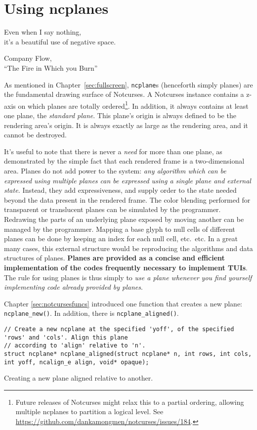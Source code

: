 \section{Using ncplanes}
\label{sec:planes}
\epigraph{Even when I say nothing,\\ it's a beautiful use of negative space.}{Company Flow,\\``The Fire in Which you Burn''}
\label{ncplane}
As mentioned in Chapter~\ref{sec:fullscreen}, \texttt{ncplane}s (henceforth
simply planes) are the fundamental drawing surface of Notcurses. A Notcurses
instance contains a z-axis on which planes are totally ordered\footnote{Future
releases of Notcurses might relax this to a partial ordering, allowing
multiple ncplanes to partition a logical level. See
\url{https://github.com/dankamongmen/notcurses/issues/184}.}. In addition, it
always contains at least one plane, the \textit{standard plane}. This plane's
origin is always defined to be the rendering area's origin. It is always
exactly as large as the rendering area, and it cannot be destroyed.

It's useful to note that there is never a \textit{need} for more than one plane,
as demonstrated by the simple fact that each rendered frame is a two-dimensional
area. Planes do not add power to the system: \textit{any algorithm which can be expressed using multiple planes can be expressed
using a single plane and external state.} Instead, they add expressiveness, and
supply order to the state needed beyond the data present in the rendered frame.
The color blending performed for transparent or translucent planes can be
simulated by the programmer. Redrawing the parts of an underlying plane exposed
by moving another can be managed by the programmer. Mapping a base glyph to
null cells of different planes can be done by keeping an index for each null
cell, etc.\ etc. In a great many cases, this external structure would be
reproducing the algorithms and data structures of planes. \textbf{Planes are
provided as a concise and efficient implementation of the codes frequently
necessary to implement TUIs}. The rule for using planes is thus simply to
\textit{use a plane whenever you find yourself implementing code already
provided by planes}.

Chapter \ref{sec:notcursesfuncs} introduced one function that creates a new
plane: \texttt{ncplane\_new()}. In addition, there is \texttt{ncplane\_aligned()}.

\begin{listing}[!htb]
\begin{verbatim}
// Create a new ncplane at the specified 'yoff', of the specified 'rows' and 'cols'. Align this plane
// according to 'align' relative to 'n'.
struct ncplane* ncplane_aligned(struct ncplane* n, int rows, int cols, int yoff, ncalign_e align, void* opaque);
\end{verbatim}
\caption{Creating a new plane aligned relative to another.}
\end{listing}

